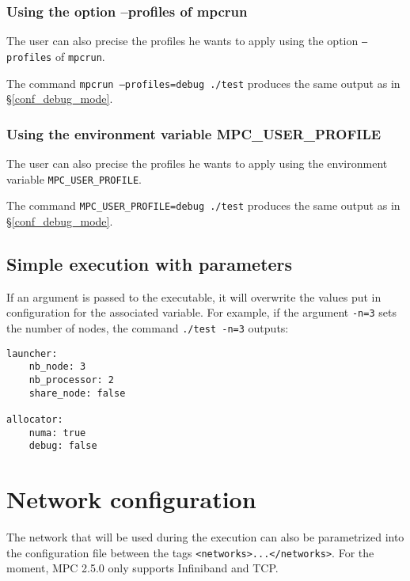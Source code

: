 \documentclass{article}
\begin{document}
\subsubsection{Using the option --profiles of mpcrun}

The user can also precise the profiles he wants to apply using the option \texttt{--profiles} of \texttt{mpcrun}.
\newline

\noindent The command \texttt{mpcrun --profiles=debug ./test} produces the same output as in §\ref{conf_debug_mode}.

\subsubsection{Using the environment variable MPC\_USER\_PROFILE}

The user can also precise the profiles he wants to apply using the environment variable \texttt{MPC\_USER\_PROFILE}.
\newline

\noindent The command \texttt{MPC\_USER\_PROFILE=debug ./test} produces the same output as in §\ref{conf_debug_mode}.

\subsection{Simple execution with parameters}

If an argument is passed to the executable, it will overwrite the values put in configuration for the associated variable. For example, if the argument \texttt{-n=3} sets the number of nodes, the command \texttt{./test -n=3} outputs:

\lstset{language=bash}
\begin{lstlisting}[title=Simple execution with parameters]
launcher:
    nb_node: 3
    nb_processor: 2
    share_node: false

allocator:
    numa: true
    debug: false
\end{lstlisting}

\section{Network configuration}

The network that will be used during the execution can also be parametrized into the configuration file between the tags \texttt{<networks>...</networks>}. For the moment, MPC 2.5.0 only supports Infiniband and TCP.
\newline
\end{document}
